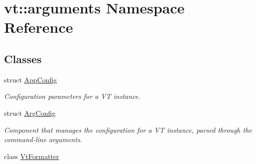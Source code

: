 \hypertarget{namespacevt_1_1arguments}{}\section{vt\+:\+:arguments Namespace Reference}
\label{namespacevt_1_1arguments}
\subsection*{Classes}
\begin{DoxyCompactItemize}
\item 
struct \hyperlink{structvt_1_1arguments_1_1_app_config}{App\+Config}
\begin{DoxyCompactList}\small\item\em Configuration parameters for a VT instance. \end{DoxyCompactList}\item 
struct \hyperlink{structvt_1_1arguments_1_1_arg_config}{Arg\+Config}
\begin{DoxyCompactList}\small\item\em Component that manages the configuration for a VT instance, parsed through the command-\/line arguments. \end{DoxyCompactList}\item 
class \hyperlink{classvt_1_1arguments_1_1_vt_formatter}{Vt\+Formatter}
\end{DoxyCompactItemize}
